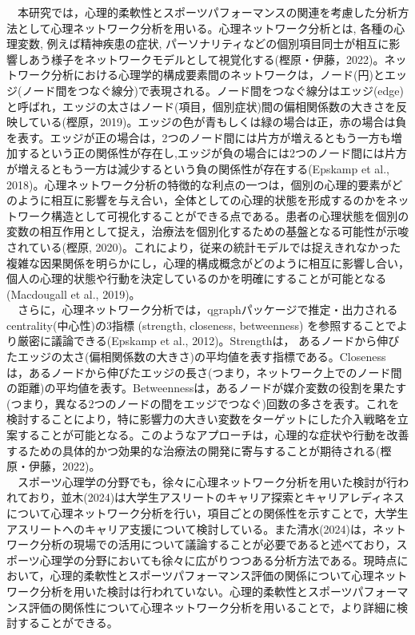 \documentclass[12pt,a4paper,xelatex,ja=standard]{bxjsarticle}
\begin{document}
　本研究では，心理的柔軟性とスポーツパフォーマンスの関連を考慮した分析方法として心理ネットワーク分析を用いる。心理ネットワーク分析とは,
各種の心理変数, 例えば精神疾患の症状,
パーソナリティなどの個別項目同士が相互に影響しあう様子をネットワークモデルとして視覚化する(樫原・伊藤，2022)。ネットワーク分析における心理学的構成要素間のネットワークは，ノード(円)とエッジ(ノード間をつなぐ線分)で表現される。ノード間をつなぐ線分はエッジ(edge)と呼ばれ，エッジの太さはノード(項目，個別症状)間の偏相関係数の大きさを反映している(樫原，2019)。エッジの色が青もしくは緑の場合は正，赤の場合は負を表す。エッジが正の場合は，2つのノード間には片方が増えるともう一方も増加するという正の関係性が存在し,エッジが負の場合には2つのノード間には片方が増えるともう一方は減少するという負の関係性が存在する(Epskamp
et al.,
2018)。心理ネットワーク分析の特徴的な利点の一つは，個別の心理的要素がどのように相互に影響を与え合い，全体としての心理的状態を形成するのかをネットワーク構造として可視化することができる点である。患者の心理状態を個別の変数の相互作用として捉え，治療法を個別化するための基盤となる可能性が示唆されている(樫原,
2020)。これにより，従来の統計モデルでは捉えきれなかった複雑な因果関係を明らかにし，心理的構成概念がどのように相互に影響し合い，個人の心理的状態や行動を決定しているのかを明確にすることが可能となる(Macdougall
et al., 2019)。\\
　さらに，心理ネットワーク分析では，qgraphパッケージで推定・出力されるcentrality(中心性)の3指標
(strength, closeness, betweenness)
を参照することでより厳密に議論できる(Epskamp et al., 2012)。Strengthは，
あるノードから伸びたエッジの太さ(偏相関係数の大きさ)の平均値を表す指標である。Closeness
は，あるノードから伸びたエッジの長さ(つまり，ネットワーク上でのノード間の距離)の平均値を表す。Betweennessは，あるノードが媒介変数の役割を果たす(つまり，異なる2つのノードの間をエッジでつなぐ)回数の多さを表す。これを検討することにより，特に影響力の大きい変数をターゲットにした介入戦略を立案することが可能となる。このようなアプローチは，心理的な症状や行動を改善するための具体的かつ効果的な治療法の開発に寄与することが期待される(樫原・伊藤，2022)。\\
　スポーツ心理学の分野でも，徐々に心理ネットワーク分析を用いた検討が行われており，並木(2024)は大学生アスリートのキャリア探索とキャリアレディネスについて心理ネットワーク分析を行い，項目ごとの関係性を示すことで，大学生アスリートへのキャリア支援について検討している。また清水(2024)は，ネットワーク分析の現場での活用について議論することが必要であると述べており，スポーツ心理学の分野においても徐々に広がりつつある分析方法である。現時点において，心理的柔軟性とスポーツパフォーマンス評価の関係について心理ネットワーク分析を用いた検討は行われていない。心理的柔軟性とスポーツパフォーマンス評価の関係性について心理ネットワーク分析を用いることで，より詳細に検討することができる。
\end{document}
